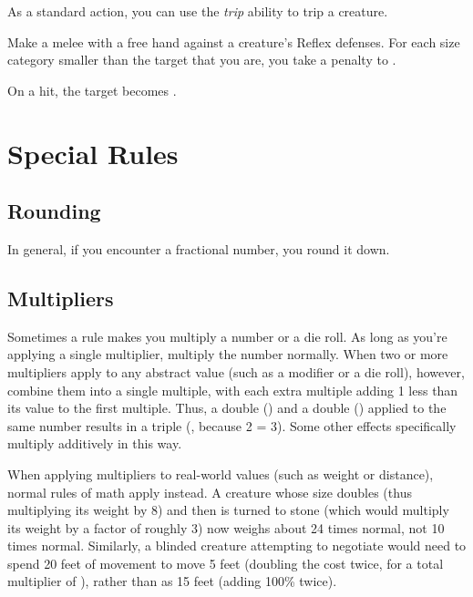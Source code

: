          As a standard action, you can use the \textit{trip} ability to trip a creature.

        \begin{freeability}{}
            Make a melee  with a free hand against a creature's Reflex defenses.
            For each size category smaller than the target that you are, you take a  penalty to .

            On a hit, the target becomes \prone.
        \end{freeability}

\section{Special Rules}

    \subsection{Rounding}
        In general, if you encounter a fractional number, you round it down.

    \subsection{Multipliers}
        Sometimes a rule makes you multiply a number or a die roll.
        As long as you're applying a single multiplier, multiply the number normally.
        When two or more multipliers apply to any abstract value (such as a modifier or a die roll), however, combine them into a single multiple, with each extra multiple adding 1 less than its value to the first multiple.
        Thus, a double () and a double () applied to the same number results in a triple (, because 2  = 3).
        Some other effects specifically multiply additively in this way.

        When applying multipliers to real-world values (such as weight or distance), normal rules of math apply instead.
        A creature whose size doubles (thus multiplying its weight by 8) and then is turned to stone (which would multiply its weight by a factor of roughly 3) now weighs about 24 times normal, not 10 times normal.
        Similarly, a blinded creature attempting to negotiate  would need to spend 20 feet of movement to move 5 feet (doubling the cost twice, for a total multiplier of ), rather than as 15 feet (adding 100\% twice).

